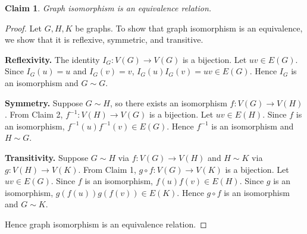 \documentclass{article}
\newtheorem{claim}{Claim}
\begin{document}
\begin{claim}
    Graph isomorphism is an equivalence relation.
\end{claim}

\begin{proof}
    Let $G,H,K$ be graphs. To show that graph isomorphism is an equivalence, we show that it is 
    reflexive, symmetric, and transitive.

    \medskip
    \textbf{Reflexivity.}
    The identity $I_G : V(G) \to V(G)$ is a bijection. Let $uv \in E(G)$. Since $I_G(u) = u$ and 
    $I_G(v) = v$, $I_G(u)I_G(v) = uv \in E(G)$. Hence $I_G$ is an isomorphism and $G \sim G$.
    
    \medskip
    \textbf{Symmetry.}
    Suppose $G \sim H$, so there exists an isomorphism $f : V(G) \to V(H)$. From Claim 2, $f^{-1} 
    : V(H) \to V(G)$ is a bijection. Let $uv \in E(H)$. Since $f$ is an isomorphism, 
    $f^{-1}(u)f^{-1}(v) \in E(G)$. Hence $f^{-1}$ is an isomorphism and $H \sim G$.

    \medskip
    \textbf{Transitivity.}
    Suppose $G \sim H$ via $f : V(G) \to V(H)$ and $H \sim K$ via $g : V(H) \to V(K)$. From Claim 1, 
    $g \circ f : V(G) \to V(K)$ is a bijection. Let $uv \in E(G)$. Since $f$ is an isomorphism, 
    $f(u)f(v) \in E(H)$. Since $g$ is an isomorphism, $g(f(u))g(f(v)) \in E(K)$. Hence $g \circ f$ 
    is an isomorphism and $G \sim K$.

    \medskip
    Hence graph isomorphism is an equivalence relation.
\end{proof}
\end{document}
